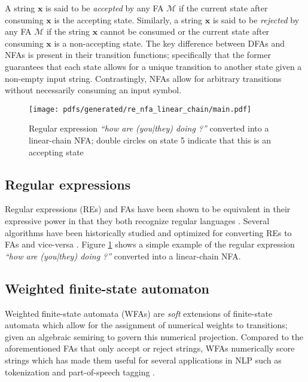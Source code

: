 A string $\pmb{x}$ is said to be \textit{accepted} by any FA $\mathcal{M}$ if the current state after consuming $\pmb{x}$ is the accepting state. Similarly, a string $\pmb{x}$ is said to be \textit{rejected} by any FA $\mathcal{M}$ if the string $\pmb{x}$ cannot be consumed or the current state after consuming $\pmb{x}$ is a non-accepting state. The key difference between DFAs and NFAs is present in their transition functions; specifically that the former guarantees that each state allows for a unique transition to another state given a non-empty input string. Contrastingly, NFAs allow for arbitrary transitions without necessarily consuming an input symbol.

\begin{figure}[t]
  \centering
  \texttt{[image: pdfs/generated/re\_nfa\_linear\_chain/main.pdf]}
  \caption{Regular expression \textit{``how are (you|they) doing ?''} converted into a linear-chain NFA; double circles on state 5 indicate that this is an accepting state}
  \label{fig:regex-fsa}
\end{figure}

\subsection{Regular expressions}

Regular expressions (REs) and FAs have been shown to be equivalent in their expressive power in that they both recognize regular languages \citep{sipser1996introduction}. Several algorithms have been historically studied and optimized for converting REs to FAs and vice-versa \citep{mcnaughton1960regular}. Figure \ref{fig:regex-fsa} shows a simple example of the regular expression \textit{``how are (you|they) doing ?''} converted into a linear-chain NFA.

\subsection{Weighted finite-state automaton}

Weighted finite-state automata (WFAs) are \textit{soft} extensions of finite-state automata which allow for the assignment of numerical weights to transitions; given an algebraic semiring to govern this numerical projection. Compared to the aforementioned FAs that only accept or reject strings, WFAs numerically score strings which has made them useful for several applications in NLP such as tokenization and part-of-speech tagging \citep{maletti2017survey}. 


